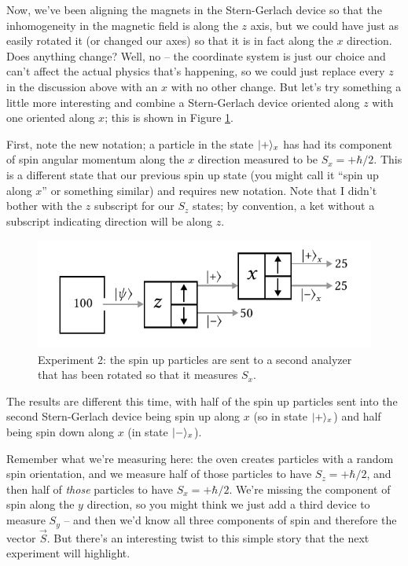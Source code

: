 Now, we've been aligning the magnets in the Stern-Gerlach device so that the inhomogeneity in the magnetic field is along the $z$ axis, but we could have just as easily rotated it (or changed our axes) so that it is in fact along the $x$ direction.  Does anything change?  Well, no -- the coordinate system is just our choice and can't affect the actual physics that's happening, so we could just replace every $z$ in the discussion above with an $x$ with no other change.  But let's try something a little more interesting and combine a Stern-Gerlach device oriented along $z$ with one oriented along $x$; this is shown in Figure \ref{fig_sg_2}.

First, note the new notation; a particle in the state $| + \rangle_x$ has had its component of spin angular momentum along the $x$ direction measured to be $S_x = +\hbar/2$.  This is a different state that our previous spin up state (you might call it ``spin up along $x$'' or something similar) and requires new notation.  Note that I didn't bother with the $z$ subscript for our $S_z$ states; by convention, a ket without a subscript indicating direction will be along $z$.

\begin{figure}
\centering\includegraphics[width=0.8\linewidth]{Figures/Chapter 1/fig_sg_2.pdf}
\caption{Experiment 2: the spin up particles are sent to a second analyzer that has been rotated so that it measures $S_x$. }
\label{fig_sg_2}
\end{figure}

The results are different this time, with half of the spin up particles sent into the second Stern-Gerlach device being spin up along $x$ (so in state $| + \rangle_x$) and half being spin down along $x$ (in state $| - \rangle_x$).

Remember what we're measuring here:  the oven creates particles with a random spin orientation, and we measure half of those particles to have $S_z = +\hbar/2$, and then half of \emph{those} particles to have $S_x = +\hbar/2$.  We're missing the component of spin along the $y$ direction, so you might think we just add a third device to measure $S_y$ -- and then we'd know all three components of spin and therefore the vector $\vec{S}$.  But there's an interesting twist to this simple story that the next experiment will highlight.

